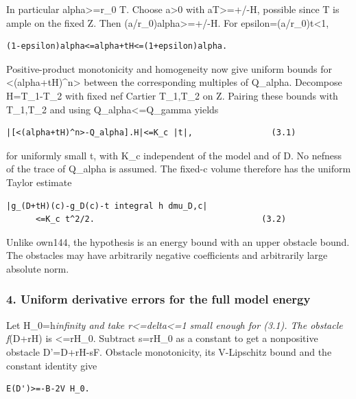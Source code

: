 \documentclass[
  10pt,
]{article}
\begin{document}
In particular alpha\textgreater=r\_0 T. Choose a\textgreater0 with
aT\textgreater=+/-H, possible since T is ample on the fixed Z. Then
(a/r\_0)alpha\textgreater=+/-H. For
epsilon=(a/r\_0)\textbar t\textbar\textless1,

\begin{verbatim}
(1-epsilon)alpha<=alpha+tH<=(1+epsilon)alpha.
\end{verbatim}

Positive-product monotonicity and homogeneity now give uniform bounds
for \textless(alpha+tH)\^{}n\textgreater{} between the corresponding
multiples of Q\_alpha. Decompose H=T\_1-T\_2 with fixed nef Cartier
T\_1,T\_2 on Z. Pairing these bounds with T\_1,T\_2 and using
Q\_alpha\textless=Q\_gamma yields

\begin{verbatim}
|[<(alpha+tH)^n>-Q_alpha].H|<=K_c |t|,                (3.1)
\end{verbatim}

for uniformly small t, with K\_c independent of the model and of D. No
nefness of the trace of Q\_alpha is assumed. The fixed-c volume
therefore has the uniform Taylor estimate

\begin{verbatim}
|g_(D+tH)(c)-g_D(c)-t integral h dmu_D,c|
      <=K_c t^2/2.                                  (3.2)
\end{verbatim}

Unlike own144, the hypothesis is an energy bound with an upper obstacle
bound. The obstacles may have arbitrarily negative coefficients and
arbitrarily large absolute norm.

\subsubsection{4. Uniform derivative errors for the full model
energy}\label{uniform-derivative-errors-for-the-full-model-energy}

Let H\_0=\textbar\textbar h\textbar\textbar{}\emph{infinity and take
\textbar r\textbar\textless=delta\textless=1 small enough for (3.1). The
obstacle f}(D+rH) is \textless=\textbar r\textbar H\_0. Subtract
s=\textbar r\textbar H\_0 as a constant to get a nonpositive obstacle
D'=D+rH-sF. Obstacle monotonicity, its V-Lipschitz bound and the
constant identity give

\begin{verbatim}
E(D')>=-B-2V H_0.
\end{verbatim}
\end{document}
